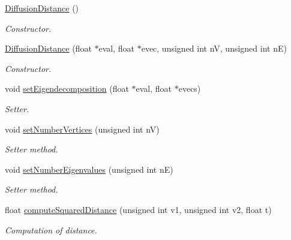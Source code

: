 \begin{DoxyCompactItemize}
\item 
\hyperlink{classHeatDiffusion_1_1Distance_1_1DiffusionDistance_a8e8baa67a9e1c65048efc05bcfbf9f09}{Diffusion\-Distance} ()
\begin{DoxyCompactList}\small\item\em Constructor. \end{DoxyCompactList}\item 
\hyperlink{classHeatDiffusion_1_1Distance_1_1DiffusionDistance_ab0894c1a691c9567c65213b61bed2d77}{Diffusion\-Distance} (float $\ast$eval, float $\ast$evec, unsigned int n\-V, unsigned int n\-E)
\begin{DoxyCompactList}\small\item\em Constructor. \end{DoxyCompactList}\item 
void \hyperlink{classHeatDiffusion_1_1Distance_1_1DiffusionDistance_ac3d6b4fa16cc891a82806045bc599791}{set\-Eigendecomposition} (float $\ast$eval, float $\ast$evecs)
\begin{DoxyCompactList}\small\item\em Setter. \end{DoxyCompactList}\item 
void \hyperlink{classHeatDiffusion_1_1Distance_1_1DiffusionDistance_abd101e871396332059f01fa8efad95ef}{set\-Number\-Vertices} (unsigned int n\-V)
\begin{DoxyCompactList}\small\item\em Setter method. \end{DoxyCompactList}\item 
void \hyperlink{classHeatDiffusion_1_1Distance_1_1DiffusionDistance_a36f61f5a8dcca43a543fb22923febd63}{set\-Number\-Eigenvalues} (unsigned int n\-E)
\begin{DoxyCompactList}\small\item\em Setter method. \end{DoxyCompactList}\item 
float \hyperlink{classHeatDiffusion_1_1Distance_1_1DiffusionDistance_a875412ee91d4a5b945d32ebf4c72bb16}{compute\-Squared\-Distance} (unsigned int v1, unsigned int v2, float t)
\begin{DoxyCompactList}\small\item\em Computation of distance. \end{DoxyCompactList}\end{DoxyCompactItemize}
